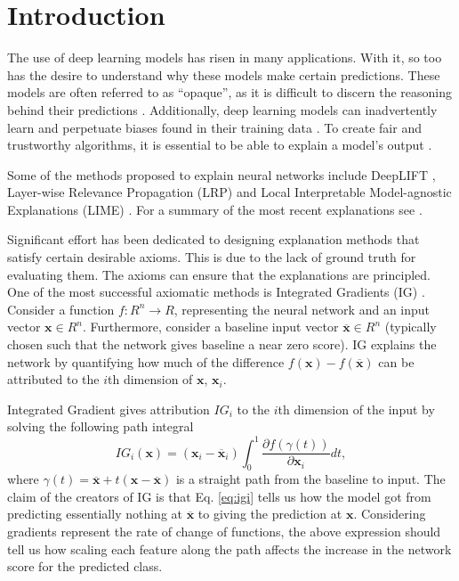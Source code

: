 \section{Introduction}
\label{sec:introduction}

The use of deep learning models has risen in many applications. With it, so too has the desire to understand why these models make certain predictions. These models are often referred to as ``opaque'', as it is difficult to discern the reasoning behind their predictions \citep{marcus2018deep}. Additionally, deep learning models can inadvertently learn and perpetuate biases found in their training data \citep{sap2019risk}. To create fair and trustworthy algorithms, it is essential to be able to explain a model's output \citep{das2020opportunities}. 

Some of the methods proposed to explain neural networks include DeepLIFT  \citep{shrikumar2017learning}, Layer-wise Relevance Propagation (LRP) \citep{bach2015pixel} and Local Interpretable Model-agnostic Explanations (LIME) \citep{ribeiro2016should}. For a summary of the most recent explanations see \citet{holzinger2022explainable}.

Significant effort has been dedicated to designing explanation methods that satisfy certain desirable axioms. This is due to the lack of ground truth for evaluating them. The axioms can ensure that the explanations are principled. One of the most successful axiomatic methods is Integrated Gradients (IG) \citep{sundararajan2017axiomatic}. Consider a function $f : R^n \to R$, representing the neural network and an input vector $\textbf{x} \in R^n$. Furthermore, consider a baseline input vector $\overline{\textbf{x}} \in R^n$ (typically chosen such that the network gives baseline a near zero score). IG explains the network by quantifying how much of the difference $f(\textbf{x}) - f(\overline{\textbf{x}})$ can be attributed to the $i$th dimension of $\textbf{x}$, $\textbf{x}_i$.

Integrated Gradient gives attribution $IG_i$ to the $i$th dimension of the input by solving the following path integral
\begin{equation}
IG_i(\textbf{x}) = (\textbf{x}_i - \overline{\textbf{x}}_i) \int_0^1 \frac{\partial f(\gamma(t))}{\partial \textbf{x}_i} dt, \label{eq:igi}
\end{equation}
where $\gamma(t) = \overline{\textbf{x}} + t(\textbf{x} - \overline{\textbf{x}})$ is a straight path from the baseline to input. The claim of the creators of IG is that Eq. \ref{eq:igi} tells us how the model got from predicting essentially nothing at $\overline{\textbf{x}}$ to giving the prediction at $\textbf{x}$. Considering gradients represent the rate of change of functions, the above expression should tell us how scaling each feature along the path affects the increase in the network score for the predicted class.

